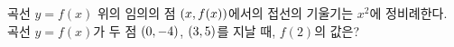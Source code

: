 곡선 $y=f(x)$ 위의 임의의 점 $(x{,}\mkern3mu\mathopen{}f(x))$에서의 접선의 기울기는 $x^2$에 정비례한다. 곡선 $y=f(x)$가 두 점 $(0{,}\mkern3mu\mathopen{}-4)$, $(3{,}\mkern3mu\mathopen{}5)$를 지날 때, $f(2)$의 값은?
